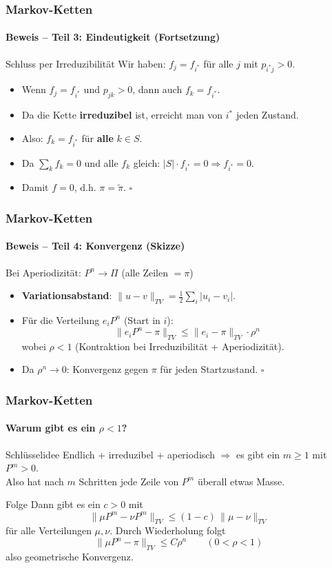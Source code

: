 \documentclass{beamer}
\begin{document}
\begin{frame}
    \frametitle{Markov-Ketten}
\framesubtitle{Beweis -- Teil 3: Eindeutigkeit (Fortsetzung)}
    \begin{block}{Schluss per Irreduzibilität}
Wir haben: $f_j = f_{i^*}$ für alle $j$ mit $p_{i^*j} > 0$.
\end{block}
\begin{itemize}
\item Wenn $f_j = f_{i^*}$ und $p_{jk} > 0$, dann auch $f_k = f_{i^*}$.
\item Da die Kette \textbf{irreduzibel} ist, erreicht man von $i^*$ jeden Zustand.
\item Also: $f_k = f_{i^*}$ für \textbf{alle} $k \in S$.
\item Da $\sum_k f_k = 0$ und alle $f_k$ gleich: $|S| \cdot f_{i^*} = 0 \Rightarrow f_{i^*} = 0$.
\item Damit $f = 0$, d.h. $\pi = \tilde{\pi}$. \hfill $\square$
\end{itemize}
 \end{frame}



\begin{frame}
    \frametitle{Markov-Ketten}
\framesubtitle{Beweis -- Teil 4: Konvergenz (Skizze)}
    \begin{block}{Bei Aperiodizität: $P^n \to \Pi$ (alle Zeilen $= \pi$)}
\end{block}
\begin{itemize}
\item \textbf{Variationsabstand}: $\|u - v\|_{TV} = \frac{1}{2}\sum_i |u_i - v_i|$.
\item Für die Verteilung $e_i P^n$ (Start in $i$):
\[
\|e_i P^n - \pi\|_{TV} \leq \|e_i - \pi\|_{TV} \cdot \rho^n
\]
wobei $\rho < 1$ (Kontraktion bei Irreduzibilität + Aperiodizität).
\item Da $\rho^n \to 0$: Konvergenz gegen $\pi$ für jeden Startzustand. \hfill $\square$
\end{itemize}
 \end{frame}


\begin{frame}
    \frametitle{Markov-Ketten}
\framesubtitle{Warum gibt es ein $\rho < 1$?}
    \begin{block}{Schlüsselidee}
Endlich + irreduzibel + aperiodisch $\Rightarrow$ es gibt ein $m \geq 1$ mit $P^m > 0$.\\
Also hat nach $m$ Schritten jede Zeile von $P^m$ überall etwas Masse.
\end{block}
\begin{block}{Folge}
Dann gibt es ein $c > 0$ mit
\[
\|\mu P^m - \nu P^m\|_{TV} \leq (1-c)\,\|\mu-\nu\|_{TV}
\]
für alle Verteilungen $\mu,\nu$. Durch Wiederholung folgt
\[
\|\mu P^n - \pi\|_{TV} \leq C\rho^n \qquad (0<\rho<1)
\]
also geometrische Konvergenz.
\end{block}
 \end{frame}
\end{document}
